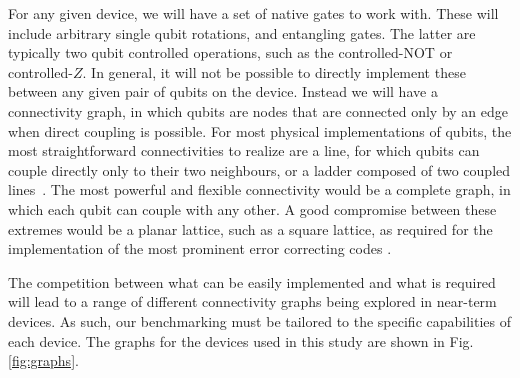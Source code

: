 \documentclass[aps,prl,twocolumn,showpacs,preprintnumbers]{revtex4-1}
\begin{document}
For any given device, we will have a set of native gates to work with. These will include arbitrary single qubit rotations, and entangling gates. The latter are typically two qubit controlled operations, such as the controlled-NOT or controlled-$Z$. In general, it will not be possible to directly implement these between any given pair of qubits on the device. Instead we will have a connectivity graph, in which qubits are nodes that are connected only by an edge when direct coupling is possible. For most physical implementations of qubits, the most straightforward connectivities to realize are a line, for which qubits can couple directly only to their two neighbours, or a ladder composed of two coupled lines~\cite{gambetta:17}. The most powerful and flexible connectivity would be a complete graph, in which each qubit can couple with any other. A good compromise between these extremes would be a planar lattice, such as a square lattice, as required for the implementation of the most prominent error correcting codes \cite{dennis,lidar:13}.

The competition between what can be easily implemented and what is required will lead to a range of different connectivity graphs being explored in near-term devices. As such, our benchmarking must be tailored to the specific capabilities of each device. The graphs for the devices used in this study are shown in Fig. \ref{fig:graphs}.
\end{document}
